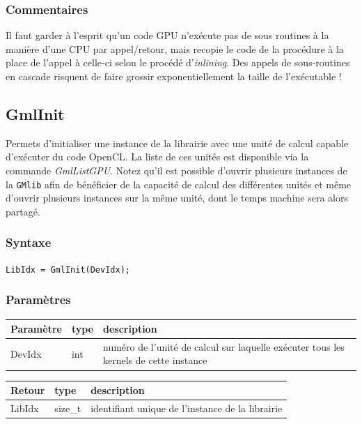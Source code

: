 \documentclass[a4paper,12pt]{article}
\begin{document}
\subsubsection*{Commentaires}

Il faut garder à l'esprit qu'un code GPU n'exécute pas de sous routines à la manière d'une CPU par appel/retour, mais recopie le code de la procédure à la place de l'appel à celle-ci selon le procédé d'\emph{inlining}.
Des appels de sous-routines en cascade risquent de faire grossir exponentiellement la taille de l'exécutable !


\subsection{GmlInit}

Permets d'initialiser une instance de la librairie avec une unité de calcul capable d'exécuter du code OpenCL.
La liste de ces unités est disponible via la commande \emph{GmlListGPU}.
Notez qu'il est possible d'ouvrir plusieurs instances de la {\tt GMlib} afin de bénéficier de la capacité de calcul des différentes unités et même d'ouvrir plusieurs instances sur la même unité, dont le temps machine sera alors partagé.

\subsubsection*{Syntaxe}

{\tt LibIdx = GmlInit(DevIdx);}

\subsubsection*{Paramètres}

\begin{tabular}{|m{2cm}|m{1.5cm}|m{10.5cm}|}
\hline
Paramètre  & type   & description \\
\hline
DevIdx     & int    & numéro de l'unité de calcul sur laquelle exécuter tous les kernels de cette instance \\
\hline
\end{tabular}

\medskip

\begin{tabular}{|m{2cm}|m{1.5cm}|m{10.5cm}|}
\hline
Retour     & type    & description \\
\hline
LibIdx     & size\_t & identifiant unique de l'instance de la librairie \\
\hline
\end{tabular}
\end{document}
